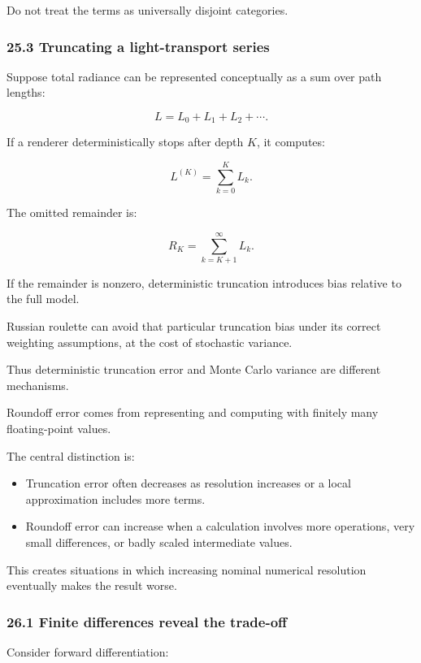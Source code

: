 Do not treat the terms as universally disjoint categories.

\subsubsection{25.3 Truncating a light-transport series}\label{truncating-a-light-transport-series}

Suppose total radiance can be represented conceptually as a sum over path lengths:

\[ L=L_0+L_1+L_2+\cdots. \]

If a renderer deterministically stops after depth \(K\), it computes:

\[ L^{(K)}=\sum_{k=0}^{K}L_k. \]

The omitted remainder is:

\[ \boxed{ R_K=\sum_{k=K+1}^{\infty}L_k }. \]

If the remainder is nonzero, deterministic truncation introduces bias relative to the full model.

Russian roulette can avoid that particular truncation bias under its correct weighting assumptions, at the cost of stochastic variance.

Thus deterministic truncation error and Monte Carlo variance are different mechanisms.

Roundoff error comes from representing and computing with finitely many floating-point values.

The central distinction is:

\begin{itemize}
\tightlist
\item
  Truncation error often decreases as resolution increases or a local approximation includes more terms.
\item
  Roundoff error can increase when a calculation involves more operations, very small differences, or badly scaled intermediate values.
\end{itemize}

This creates situations in which increasing nominal numerical resolution eventually makes the result worse.

\subsubsection{26.1 Finite differences reveal the trade-off}\label{finite-differences-reveal-the-trade-off}

Consider forward differentiation:

